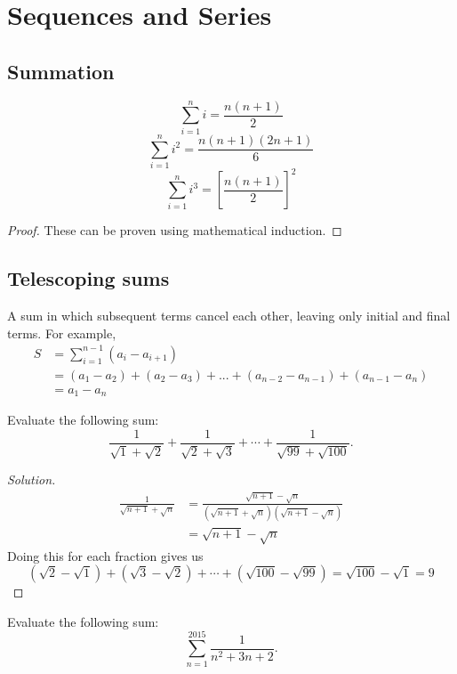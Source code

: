 \chapter{Sequences and Series}
\section{Summation}
\begin{equation} \sum_{i=1}^{n} i = \frac{n(n+1)}{2} \end{equation}
\begin{equation} \sum_{i=1}^{n} i^2 = \frac{n(n+1)(2n+1)}{6} \end{equation}
\begin{equation} \sum_{i=1}^{n} i^3 = \left[\frac{n(n+1)}{2}\right]^2 \end{equation}
\begin{proof}
These can be proven using mathematical induction.
\end{proof}

\section{Telescoping sums}
A sum in which subsequent terms cancel each other, leaving only initial and final terms. For example,
\begin{align*}
S &= \sum_{i=1}^{n-1} (a_i-a_{i+1})	
\\&= (a_1-a_2)+(a_2-a_3)+...+(a_{n-2}-a_{n-1})+(a_{n-1}-a_n)	
\\&= a_1-a_n	
\end{align*}

\begin{exmp}{}{}
Evaluate the following sum: 
\[ \frac{1}{\sqrt{1}+\sqrt{2}} + \frac{1}{\sqrt{2}+\sqrt{3}} + \cdots + \frac{1}{\sqrt{99}+\sqrt{100}}. \] 
\end{exmp}

\begin{proof}[Solution]
\begin{align*} \frac{1}{\sqrt{n+1}+\sqrt{n}} &= \frac{\sqrt{n+1}-\sqrt{n}}{(\sqrt{n+1}+\sqrt{n})(\sqrt{n+1}-\sqrt{n})} \\&= \sqrt{n+1}-\sqrt{n} \end{align*}
Doing this for each fraction gives us \[ (\sqrt{2}-\sqrt{1}) + (\sqrt{3}-\sqrt{2}) + \cdots + (\sqrt{100}-\sqrt{99}) = \sqrt{100}-\sqrt{1} = 9 \]
\end{proof}

\begin{exmp}{}{} 
Evaluate the following sum:
\[ \sum_{n=1}^{2015} \frac{1}{n^2+3n+2}. \] 
\end{exmp}


